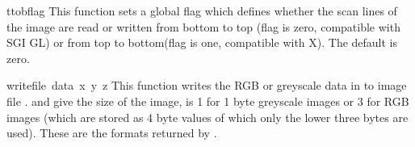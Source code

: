 \begin{funcdesc}{ttob}{flag}
This function sets a global flag which defines whether the scan lines
of the image are read or written from bottom to top (flag is zero,
compatible with SGI GL) or from top to bottom(flag is one,
compatible with X).  The default is zero.
\end{funcdesc}

\begin{funcdesc}{write}{file\, data\, x\, y\, z}
This function writes the RGB or greyscale data in  to image
file .  and  give the size of the image,
 is 1 for 1 byte greyscale images or 3 for RGB images (which are
stored as 4 byte values of which only the lower three bytes are used).
These are the formats returned by .
\end{funcdesc}
